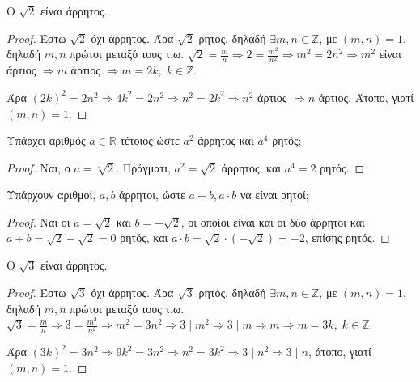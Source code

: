 \documentclass[main.tex]{subfiles}
\begin{document}
\begin{mythmbox}
  Ο $ \sqrt{2} $ είναι άρρητος.
\end{mythmbox}

\begin{proof}
  Έστω $ \sqrt{2} $ όχι άρρητος. Άρα $ \sqrt{2} $ ρητός, δηλαδή $ \exists m,n 
  \in \mathbb{Z} $, με $ (m,n)=1 $, δηλαδή $ m,n $ πρώτοι μεταξύ τους
  τ.ω. $ \sqrt{2} = \frac{m}{n} \Rightarrow 2 = \frac{m^{2}}{n^{2}} \Rightarrow 
  m^{2} = 2n^{2} \Rightarrow m^{2}$ είναι άρτιος $ \Rightarrow m $ άρτιος 
  $ \Rightarrow m = 2k, \; k \in \mathbb{Z}$. 

  Άρα $ (2k)^{2} = 2n^{2} \Rightarrow 4k^{2}=2n^{2} \Rightarrow n^{2} = 2k^{2} 
  \Rightarrow n^{2} $ άρτιος $ \Rightarrow n $ άρτιος. Άτοπο, γιατί $ (m,n)=1 $.
\end{proof}

\begin{example}
  Υπάρχει αριθμός $ a \in \mathbb{R} $ τέτοιος ώστε $ a^{2} $ άρρητος και $ a^{4} $ 
  ρητός; 
\end{example}

\begin{proof}
  Ναι, ο $ a= \sqrt[4]{2} $. Πράγματι, $ a^{2} = \sqrt{2} $ άρρητος, και $ 
  a^{4} = 2$ ρητός.
\end{proof}

\begin{example}
  Υπάρχουν αριθμοί, $ a,b $ άρρητοι, ώστε $ a+b, a\cdot b $ να είναι ρητοί;
\end{example}

\begin{proof}
  Ναι οι $ a= \sqrt{2} $ και $ b= - \sqrt{2} $, οι οποίοι είναι και οι δύο άρρητοι 
  και $ a+b= \sqrt{2} - \sqrt{2} = 0 $ ρητός, και $ a\cdot b = \sqrt{2} \cdot (- 
  \sqrt{2}) = -2 $, επίσης ρητός.
\end{proof}

\begin{example}
  Ο $ \sqrt{3} $ είναι άρρητος.
\end{example}

\begin{proof}
  Έστω $ \sqrt{3} $ όχι άρρητος. Άρα $ \sqrt{3} $ ρητός, δηλαδή $ \exists m,n 
  \in \mathbb{Z} $, με $ (m,n)=1 $, δηλαδή $ m,n $ πρώτοι μεταξύ τους
  τ.ω. $ \sqrt{3} = \frac{m}{n} \Rightarrow 3 = \frac{m^{2}}{n^{2}} \Rightarrow 
  m^{2} = 3n^{2} \Rightarrow 3 \mid m^{2} \Rightarrow 3 \mid m  \Rightarrow m 
  \Rightarrow m = 3k, \; k \in \mathbb{Z}$. 

  Άρα $ (3k)^{2} = 3n^{2} \Rightarrow 9k^{2}=3n^{2} \Rightarrow n^{2} = 3k^{2} 
  \Rightarrow 3 \mid n^{2} \Rightarrow  3 \mid n$,  άτοπο, γιατί $ (m,n)=1 $.
\end{proof}
\end{document}
